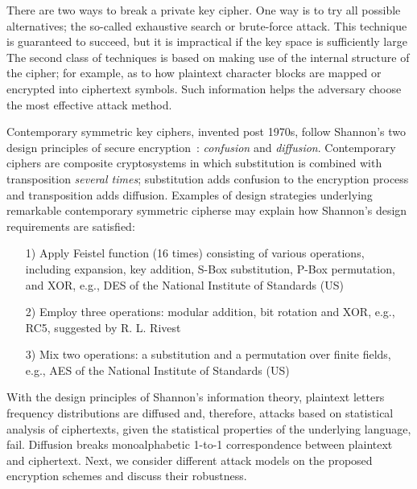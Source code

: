 \documentclass[10pt,journal]{IEEEtran}
\begin{document}
There are two ways to break a private key cipher. One way is to try
all possible alternatives; the so-called exhaustive search or brute-force 
attack. This technique is guaranteed to succeed, but it is impractical if 
the key space is sufficiently large The second class of techniques is
based on making use of the internal structure of the cipher; for
example, as to how plaintext character blocks are mapped or encrypted
into ciphertext symbols. Such information helps the
adversary choose the most effective attack method.
\newline

Contemporary symmetric key ciphers, invented post 1970s, follow 
Shannon's two design principles of secure encryption~\cite{shannon-1949}:
\emph{confusion} and \emph{diffusion}. Contemporary ciphers are 
composite cryptosystems in which substitution is combined with 
transposition \emph{several times}; substitution adds confusion to the encryption 
process and transposition adds diffusion. Examples of design strategies 
underlying remarkable contemporary symmetric cipherse may explain 
how Shannon's design requirements are satisfied:
\begin{itemize}
\item[1)] Apply Feistel function (16 times) consisting of various operations, including expansion, key addition, S-Box substitution, P-Box permutation, and XOR, e.g., DES of the National Institute of Standards (US)~\cite{NIS-1977}
\item[2)] Employ three operations: modular addition, bit rotation and XOR,  e.g., RC5, suggested by R. L. Rivest~\cite{rivest-1994}
\item[3)] Mix two operations: a substitution and a permutation over finite fields, e.g., AES of the National Institute of Standards (US)~\cite{NIS-2001}
\end{itemize}

With the design principles of Shannon's information theory, plaintext
letters frequency distributions are diffused and, therefore, attacks
based on statistical analysis of ciphertexts, given the statistical
properties of the underlying language, fail. Diffusion breaks
monoalphabetic 1-to-1 correspondence between plaintext and ciphertext.
Next, we consider different attack models on the proposed
encryption schemes and discuss their robustness.
\end{document}
